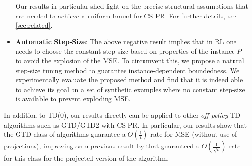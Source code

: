 \begin{itemize}[leftmargin=*]
Our results in particular shed light on the precise structural assumptions that are needed 
to achieve a uniform bound for CS-PR. 
For further details, see \cref{sec:related}.
\item \textbf{Automatic Step-Size}: 
The above negative result implies that in RL one needs to choose the constant step-size based on properties of the instance $P$ to avoid the explosion of the MSE.
To circumvent this, we propose a natural step-size tuning method to guarantee instance-dependent boundedness.
We experimentally evaluate the proposed method and find that it is indeed able to achieve its goal on a set of synthetic examples
where no constant step-size is available to prevent exploding MSE. %
\end{itemize}
In addition to TD($0$), our results directly can be applied to other \emph{off-policy} TD algorithms such as GTD/GTD2 with CS-PR. 
In particular, our results show that the GTD class of algorithms guarantee a $O(\frac{1}{t})$ rate for MSE (without use of projections), improving on a previous result by \citet{gtdmp} that guaranteed a $O(\frac{1}{\sqrt{t}})$ rate for this class for the projected version of the algorithm. 
